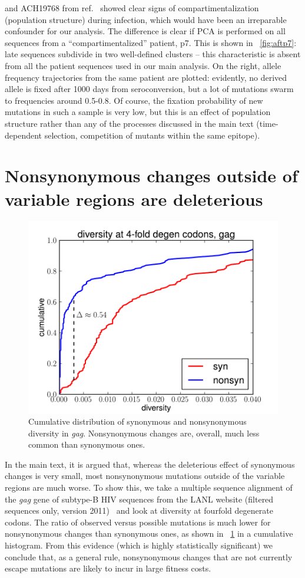 \documentclass[rmp]{revtex4}
\begin{document}
and ACH19768 from ref.~\citealp{bunnik_autologous_2008} showed clear signs of
compartimentalization (population structure) during infection, which would have
been an irreparable confounder for our analysis. The difference is clear if
PCA is performed on all sequences from a ``compartimentalized'' patient, p7.
This is shown in \figurename~\ref{fig:aftp7}: late sequences subdivide in two
well-defined clusters -- this characteristic is absent from all the patient
sequences used in our main analysis. On the right, allele frequency trajectories from the same
patient are plotted: evidently, no derived allele is fixed after 1000 days
from seroconversion, but a lot of mutations swarm to frequencies around 0.5-0.8. Of
course, the fixation probability of new mutations in such a sample is very low,
but this is an effect of population structure rather than any
of the processes discussed in the main text (time-dependent selection, competition
of mutants within the same epitope).

\clearpage

\section{Nonsynonymous changes outside of variable regions are deleterious}
\begin{figure}[h]
\begin{center}
\includegraphics[width=0.5\linewidth]{synmut_conservation_4fold_synnonsyn}
\caption{Cumulative distribution of synonymous and nonsynonymous diversity in
{\it gag}. Nonsynonymous changes are, overall, much less common than synonymous
ones.}
\label{fig:synnonsyncons}
\end{center}
\end{figure}
In the main text, it is argued that, whereas the deleterious effect of
synonymous changes is very small, most nonsynonymous mutations outside of the
variable regions are much worse. To show this, we take a multiple sequence alignment of
the {\it gag} gene of subtype-B HIV sequences from the LANL website (filtered
sequences only, version 2011)~\cite{LANL2012} and look at diversity at fourfold degenerate
codons. The ratio of observed versus possible mutations is much lower for
nonsynonymous changes than synonymous ones, as shown in
\figurename~\ref{fig:synnonsyncons} in a cumulative histogram. From this
evidence (which is highly statistically significant) we conclude that, as a
general rule, nonsynonymous changes that are not currently escape mutations
are likely to incur in large fitness costs.
\end{document}

